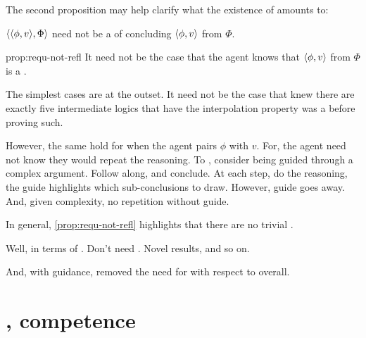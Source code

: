 \begin{note}
  The second proposition may help clarify what the existence of  amounts to:

  \begin{proposition}
    \label{prop:requ-not-refl}
    \(\langle \langle \phi, v \rangle, \Phi \rangle\) need not be a \requ{} of concluding \(\langle \phi, v \rangle\) from \(\Phi\).
  \end{proposition}
  \begin{argument}{prop:requ-not-refl}
    It need not be the case that the agent knows that \(\langle \phi, v \rangle\) from \(\Phi\) is a \fc{}.

    The simplest cases are at the outset.
    It need not be the case that \citeauthor{Maksimova:1977un} knew there are exactly five intermediate logics that have the interpolation property was a \fc{} before proving such.

    However, the same hold for when the agent pairs \(\phi\) with \(v\).
    For, the agent need not know they would repeat the reasoning.
    To , consider being guided through a complex argument.
    Follow along, and conclude.
    At each step, do the reasoning, the guide highlights which sub-conclusions to draw.
    However, guide goes away.
    And, given complexity, no repetition without guide.
  \end{argument}

  In general, \autoref{prop:requ-not-refl} highlights that there are no trivial .

  Well, in terms of .
  Don't need .
  Novel results, and so on.

  And, with guidance, removed the need for  with respect to overall.
\end{note}

\section{, competence}
\label{cha:requs:sec:add-illu}

